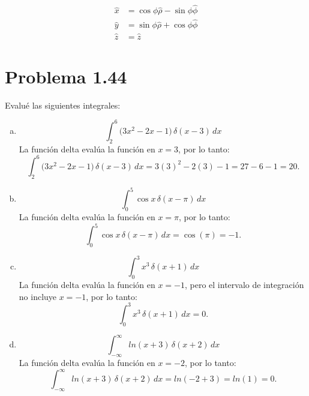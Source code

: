 \documentclass[12pt]{article}
\begin{document}
\begin{align*}
\hat{x} &= \cos\phi\hat{\rho} -\sin\phi\hat{\phi}   \\
\hat{y} &= \sin\phi\hat{\rho}  + \cos\phi\hat{\phi} \\
\hat{z} &= \hat{z}
\end{align*}
\section*{\color{blue} Problema 1.44}
Evalué las siguientes integrales: 
\begin{enumerate}[(a)]
    \item \[
\int_{2}^{6} \bigl(3x^2 - 2x - 1\bigr)\,\delta(x - 3)\,dx
\]
La función delta  evalúa la función en \(x = 3\), por lo tanto:
\[
\int_{2}^{6} \bigl(3x^2 - 2x - 1\bigr)\,\delta(x - 3)\,dx = 3(3)^2 - 2(3) - 1 = 27 - 6 - 1 = \boxed{20}.
\]
    \item \[
 \int_{0}^{5} \cos x \,\delta(x - \pi)\,dx
\]
La función delta  evalúa la función en \(x = \pi\), por lo tanto:
\[
\int_{0}^{5} \cos x \,\delta(x - \pi)\,dx = \cos(\pi) = \boxed{-1} .
\]
    \item \[
 \int_{0}^{3} x^3\,\delta(x + 1)\,dx
  \]
La función delta evalúa la función en \(x = -1\), pero el intervalo de integración no incluye \(x = -1\), por lo tanto:
\[
\int_{0}^{3} x^3\,\delta(x + 1)\,dx = \boxed{0}.
\]
    \item \[
\int_{-\infty}^{\infty} ln(x+3)\,\delta(x+2)\,dx
\]
La función delta evalúa la función en \(x =-2\), por lo tanto:
\[
\int_{-\infty}^{\infty} ln(x+3)\,\delta(x+2)\,dx = ln(-2+3) = ln(1)=\boxed{0}.
\]
\end{enumerate}

\end{document}
